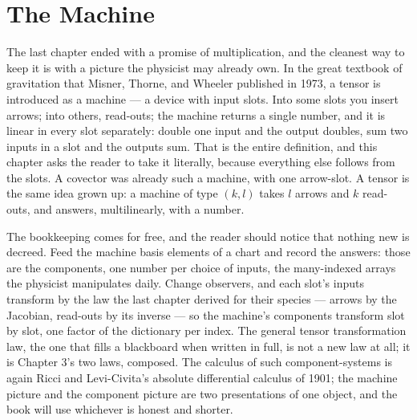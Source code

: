 \chapter{The Machine}

The last chapter ended with a promise of multiplication, and the cleanest
way to keep it is with a picture the physicist may already own. In the
great textbook of gravitation that Misner, Thorne, and Wheeler published in
1973, a tensor is introduced as a machine --- a device with input slots.
Into some slots you insert arrows; into others, read-outs; the machine
returns a single number, and it is linear in every slot separately: double
one input and the output doubles, sum two inputs in a slot and the outputs
sum. That is the entire definition, and this chapter asks the reader to
take it literally, because everything else follows from the slots. A
covector was already such a machine, with one arrow-slot. A tensor is the
same idea grown up: a machine of type $(k,l)$ takes $l$ arrows and $k$
read-outs, and answers, multilinearly, with a number.

The bookkeeping comes for free, and the reader should notice that nothing
new is decreed. Feed the machine basis elements of a chart and record the
answers: those are the components, one number per choice of inputs, the
many-indexed arrays the physicist manipulates daily. Change observers, and
each slot's inputs transform by the law the last chapter derived for their
species --- arrows by the Jacobian, read-outs by its inverse --- so the
machine's components transform slot by slot, one factor of the dictionary
per index. The general tensor transformation law, the one that fills a
blackboard when written in full, is not a new law at all; it is Chapter 3's
two laws, composed. The calculus of such component-systems is again Ricci
and Levi-Civita's absolute differential calculus of 1901; the machine
picture and the component picture are two presentations of one object, and the
book will use whichever is honest and shorter.

